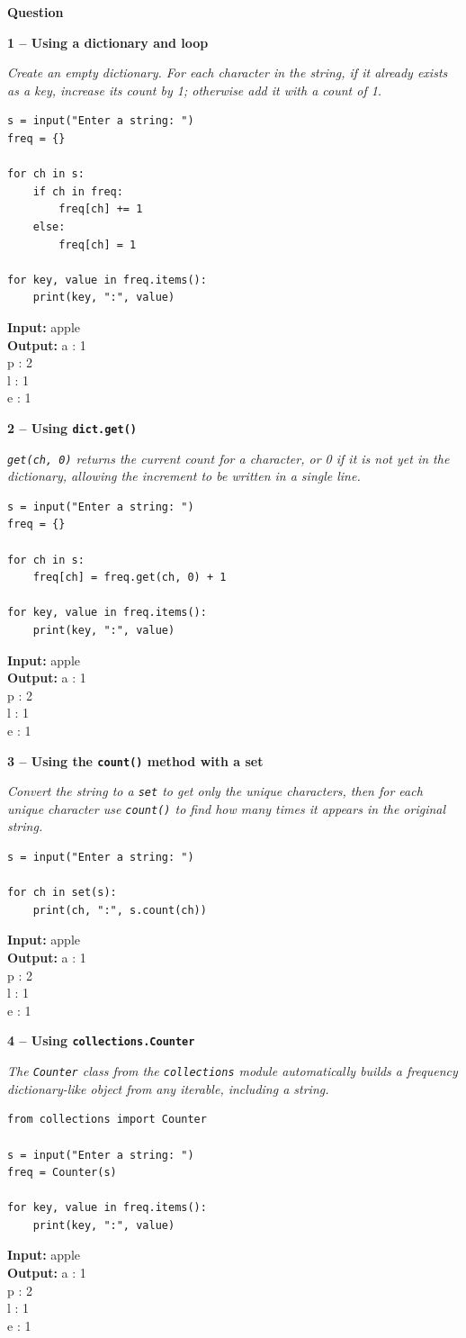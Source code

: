\documentclass[12pt]{article}
\newenvironment{qbox}[1]{\par\bigskip\noindent\textbf{#1}\par}{\par\medskip}
\newcommand{\1}{Question}
\newcommand{\method}[1]{\par\medskip\noindent\textbf{#1}\par}
\newcommand{\logicbox}[1]{\par\smallskip\noindent\textit{#1}\par}
\newcommand{\inout}[2]{\par\smallskip\noindent\textbf{Input:} #1\\\textbf{Output:} #2\par}
\begin{document}
\begin{qbox}{\1}

\method{1 -- Using a dictionary and loop}
\logicbox{Create an empty dictionary. For each character in the string, if it already exists as a key, increase its count by 1; otherwise add it with a count of 1.}
\begin{lstlisting}
s = input("Enter a string: ")
freq = {}

for ch in s:
    if ch in freq:
        freq[ch] += 1
    else:
        freq[ch] = 1

for key, value in freq.items():
    print(key, ":", value)
\end{lstlisting}
\inout{apple}{a : 1\\p : 2\\l : 1\\e : 1}

\method{2 -- Using \texttt{dict.get()}}
\logicbox{\texttt{get(ch, 0)} returns the current count for a character, or 0 if it is not yet in the dictionary, allowing the increment to be written in a single line.}
\begin{lstlisting}
s = input("Enter a string: ")
freq = {}

for ch in s:
    freq[ch] = freq.get(ch, 0) + 1

for key, value in freq.items():
    print(key, ":", value)
\end{lstlisting}
\inout{apple}{a : 1\\p : 2\\l : 1\\e : 1}

\method{3 -- Using the \texttt{count()} method with a set}
\logicbox{Convert the string to a \texttt{set} to get only the unique characters, then for each unique character use \texttt{count()} to find how many times it appears in the original string.}
\begin{lstlisting}
s = input("Enter a string: ")

for ch in set(s):
    print(ch, ":", s.count(ch))
\end{lstlisting}
\inout{apple}{a : 1\\p : 2\\l : 1\\e : 1}

\method{4 -- Using \texttt{collections.Counter}}
\logicbox{The \texttt{Counter} class from the \texttt{collections} module automatically builds a frequency dictionary-like object from any iterable, including a string.}
\begin{lstlisting}
from collections import Counter

s = input("Enter a string: ")
freq = Counter(s)

for key, value in freq.items():
    print(key, ":", value)
\end{lstlisting}
\inout{apple}{a : 1\\p : 2\\l : 1\\e : 1}
\end{qbox}
\end{document}
